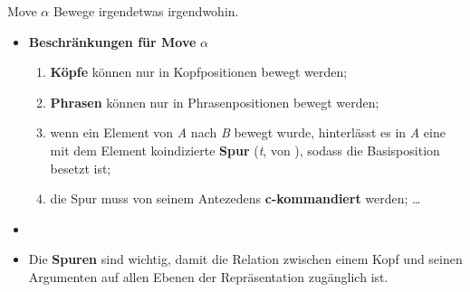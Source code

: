 \begin{frame}

\begin{block}{Move $\alpha$}
Bewege irgendetwas irgendwohin.
\end{block}

\begin{itemize}
	\item \textbf{Beschränkungen für Move} $\alpha$
	\begin{enumerate}
		\item \textbf{Köpfe} können nur in Kopfpositionen bewegt werden;
		\item \textbf{Phrasen} können nur in Phrasenpositionen bewegt werden;
		\item wenn ein Element von \emph{A} nach \emph{B} bewegt wurde, hinterlässt es in \emph{A} eine mit dem Element koindizierte \textbf{Spur} (\emph{t}, von ), sodass die Basisposition besetzt ist;
		\item die Spur muss von seinem Antezedens \textbf{c-kommandiert} werden; \dots
	\end{enumerate}
	\item[]
	\item Die \textbf{Spuren} sind wichtig, damit die Relation zwischen einem Kopf und seinen Argumenten auf allen Ebenen der Repräsentation zugänglich ist.

\end{itemize}

\end{frame}


